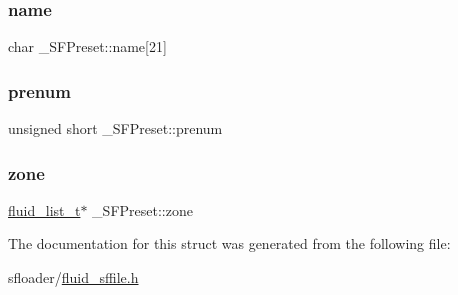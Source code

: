 \subsubsection{\texorpdfstring{name}{name}}
{\footnotesize\ttfamily char \+\_\+\+S\+F\+Preset\+::name\mbox{[}21\mbox{]}}

\mbox{\label{struct__SFPreset_ac6f87e02df4e0db458980a4081c32b20}} 
\subsubsection{\texorpdfstring{prenum}{prenum}}
{\footnotesize\ttfamily unsigned short \+\_\+\+S\+F\+Preset\+::prenum}

\mbox{\label{struct__SFPreset_aa3fa5312b26b583cc1fc6b1c6ad3d3eb}} 
\subsubsection{\texorpdfstring{zone}{zone}}
{\footnotesize\ttfamily \hyperlink{fluid__list_8h_a3ef7535d4290862c0af118569223bd89}{fluid\+\_\+list\+\_\+t}$\ast$ \+\_\+\+S\+F\+Preset\+::zone}



The documentation for this struct was generated from the following file\+:\begin{DoxyCompactItemize}
\item 
sfloader/\hyperlink{fluid__sffile_8h}{fluid\+\_\+sffile.\+h}\end{DoxyCompactItemize}
